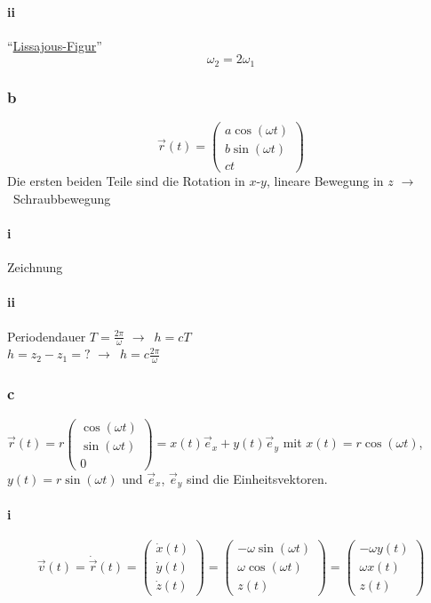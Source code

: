 \documentclass[oneside]{book}
\theoremstyle{definition}
\newcommand{\conseq}{$\rightarrow$~}
\begin{document}
\paragraph{ii}
"`\href{http://de.wikipedia.org/wiki/Lissajous-Figur}{Lissajous-Figur}"'
$$\omega_2 = 2 \omega_1$$

\subsubsection{b}
$$\vec{r}(t) = \begin{pmatrix}
a \cos(\omega t)\\ b \sin(\omega t) \\ c t
\end{pmatrix}$$
Die ersten beiden Teile sind die Rotation in $x$-$y$, lineare Bewegung in $z$ \conseq Schraubbewegung

\paragraph{i}
Zeichnung

\paragraph{ii}

Periodendauer $T = \frac{2 \pi}{\omega}$ \conseq $h = c T$\\
$h = z_2 - z_1 = ?$ \conseq $h = c \frac{2 \pi}{\omega}$

\subsubsection{c}
$\vec{r}(t) = r\begin{pmatrix}\cos(\omega t) \\ \sin(\omega t) \\ 0\end{pmatrix} = x(t) \vec{e}_x + y(t)\vec{e}_y$ mit $x(t) = r \cos(\omega t)$, $y(t) = r \sin(\omega t)$ und $\vec{e}_x$, $\vec{e}_y$ sind die Einheitsvektoren.

\paragraph{i}

$$\vec{v}(t) = \dot{\vec{r}}(t) = \begin{pmatrix}\dot{x}(t)\\ \dot{y}(t)\\ \dot{z}(t)\end{pmatrix} =  \begin{pmatrix}- \omega \sin(\omega t) \\ \omega \cos(\omega t) \\ z(t)\end{pmatrix} = \begin{pmatrix}- \omega y(t) \\ \omega x(t) \\ z(t)\end{pmatrix}$$
\end{document}
